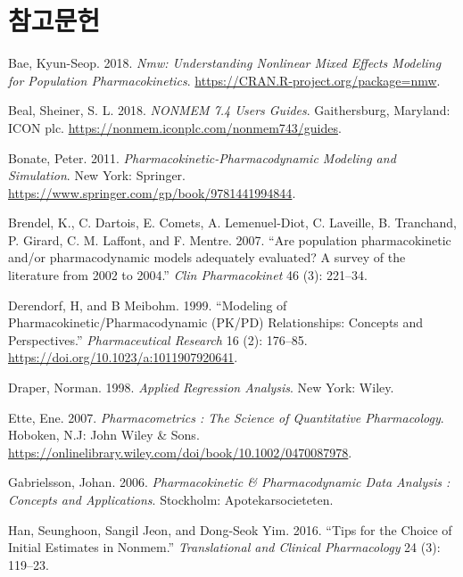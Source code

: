 \documentclass[
  11pt,
  krantz2,
  a4paper]{krantz}
\newlength{\cslhangindent}
\newenvironment{cslreferences}%
  {\setlength{\parindent}{0pt}%
  \everypar{\setlength{\hangindent}{\cslhangindent}}\ignorespaces}%
  {\par}
\theoremstyle{definition}
\theoremstyle{definition}
\theoremstyle{definition}
\theoremstyle{remark}
\begin{document}
\normalsize

\backmatter

\hypertarget{uxcc38uxace0uxbb38uxd5cc}{%
\chapter*{참고문헌}\label{uxcc38uxace0uxbb38uxd5cc}}


\hypertarget{refs}{}
\begin{cslreferences}
\leavevmode\hypertarget{ref-R-nmw}{}%
Bae, Kyun-Seop. 2018. \emph{Nmw: Understanding Nonlinear Mixed Effects Modeling for Population Pharmacokinetics}. \url{https://CRAN.R-project.org/package=nmw}.

\leavevmode\hypertarget{ref-nonmem}{}%
Beal, Sheiner, S. L. 2018. \emph{NONMEM 7.4 Users Guides}. Gaithersburg, Maryland: ICON plc. \url{https://nonmem.iconplc.com/nonmem743/guides}.

\leavevmode\hypertarget{ref-bonate}{}%
Bonate, Peter. 2011. \emph{Pharmacokinetic-Pharmacodynamic Modeling and Simulation}. New York: Springer. \url{https://www.springer.com/gp/book/9781441994844}.

\leavevmode\hypertarget{ref-pmid17328581}{}%
Brendel, K., C. Dartois, E. Comets, A. Lemenuel-Diot, C. Laveille, B. Tranchand, P. Girard, C. M. Laffont, and F. Mentre. 2007. ``Are population pharmacokinetic and/or pharmacodynamic models adequately evaluated? A survey of the literature from 2002 to 2004.'' \emph{Clin Pharmacokinet} 46 (3): 221--34.

\leavevmode\hypertarget{ref-derendorf1999modeling}{}%
Derendorf, H, and B Meibohm. 1999. ``Modeling of Pharmacokinetic/Pharmacodynamic (PK/PD) Relationships: Concepts and Perspectives.'' \emph{Pharmaceutical Research} 16 (2): 176--85. \url{https://doi.org/10.1023/a:1011907920641}.

\leavevmode\hypertarget{ref-draper1998applied}{}%
Draper, Norman. 1998. \emph{Applied Regression Analysis}. New York: Wiley.

\leavevmode\hypertarget{ref-ette}{}%
Ette, Ene. 2007. \emph{Pharmacometrics : The Science of Quantitative Pharmacology}. Hoboken, N.J: John Wiley \& Sons. \url{https://onlinelibrary.wiley.com/doi/book/10.1002/0470087978}.

\leavevmode\hypertarget{ref-gabrielsson}{}%
Gabrielsson, Johan. 2006. \emph{Pharmacokinetic \& Pharmacodynamic Data Analysis : Concepts and Applications}. Stockholm: Apotekarsocieteten.

\leavevmode\hypertarget{ref-han2016tips}{}%
Han, Seunghoon, Sangil Jeon, and Dong-Seok Yim. 2016. ``Tips for the Choice of Initial Estimates in Nonmem.'' \emph{Translational and Clinical Pharmacology} 24 (3): 119--23.


\end{cslreferences}
\end{document}
